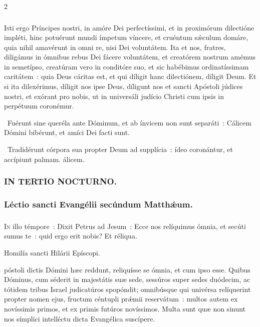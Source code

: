 \documentclass[9pt,twoside]{extarticle}
\begin{document}
\begin{multicols}{2}
{\subsubsection*{\center {}}
\lettrine{I}sti ergo Príncipes nostri, in amóre Dei perfectíssimi, et in proximórum dilectióne impléti, hinc potuérunt mundi ímpetum víncere, et cruéntum sǽculum domáre, quia nihil amavérunt in omni re, nisi Dei voluntátem. Ita et nos, fratres, diligámus in ómnibus rebus Dei fácere voluntátem, et creatórem nostrum amémus in semetípso, creatúram vero in conditóre suo, et sic habébimus ordinatíssimam caritátem~: quia Deus cáritas est, et qui díligit hanc dilectiónem, díligit Deum. Et si ita dilexérimus, díligit nos ipse Deus, díligunt nos et sancti Apóstoli júdices nostri, et exórant pro nobis, ut in universáli judício Christi cum ipsis in perpétuum coronémur.

\begin{tightlist}{}
\item {}~Fuérunt sine queréla ante Dóminum, et ab ínvicem non sunt separáti~: \textred{*} Cálicem Dómini bibérunt, et amíci Dei facti sunt.
\item {}~Tradidérunt córpora sua propter Deum ad supplícia~: ídeo coronántur, et accípiunt palmam. álicem.
\end{tightlist}

\subsubsection*{\center \textsc{IN TERTIO NOCTURNO.}}
\subsubsection*{\center Léctio sancti Evangélii secúndum Matthǽum.}
\subsubsection*{\center {}}
\lettrine{I}n illo témpore~: Dixit Petrus ad Jesum~: Ecce nos relíquimus ómnia, et secúti sumus te~: quid ergo erit nobis? Et réliqua.

\begin{center}Homilía sancti Hilárii Epíscopi.\\
\end{center}
póstoli dictis Dómini hæc reddunt, reliquísse se ómnia, et cum ipso esse. Quibus Dóminus, cum séderit in majestátis suæ sede, sessúros super sedes duódecim, ac tótidem tribus Israel judicatúros spopóndit; omnibúsque qui univérsa relíquerint propter nomen ejus, fructum céntupli prǽmii reservátum~: multos autem ex novíssimis primos, et ex primis futúros novíssimos. Multa sunt quæ non sinunt nos símplici intelléctu dicta Evangélica suscípere.

}
\end{multicols}
\end{document}

